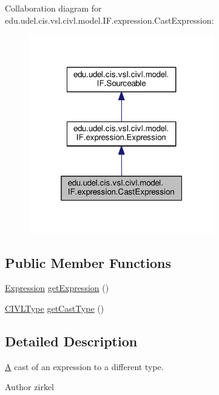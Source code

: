 Collaboration diagram for edu.\+udel.\+cis.\+vsl.\+civl.\+model.\+I\+F.\+expression.\+Cast\+Expression\+:
\nopagebreak
\begin{figure}[H]
\begin{center}
\leavevmode
\includegraphics[width=229pt]{interfaceedu_1_1udel_1_1cis_1_1vsl_1_1civl_1_1model_1_1IF_1_1expression_1_1CastExpression__coll__graph}
\end{center}
\end{figure}
\subsection*{Public Member Functions}
\begin{DoxyCompactItemize}
\item 
\hyperlink{interfaceedu_1_1udel_1_1cis_1_1vsl_1_1civl_1_1model_1_1IF_1_1expression_1_1Expression}{Expression} \hyperlink{interfaceedu_1_1udel_1_1cis_1_1vsl_1_1civl_1_1model_1_1IF_1_1expression_1_1CastExpression_a51f88078737299fb839bbac515078364}{get\+Expression} ()
\item 
\hyperlink{interfaceedu_1_1udel_1_1cis_1_1vsl_1_1civl_1_1model_1_1IF_1_1type_1_1CIVLType}{C\+I\+V\+L\+Type} \hyperlink{interfaceedu_1_1udel_1_1cis_1_1vsl_1_1civl_1_1model_1_1IF_1_1expression_1_1CastExpression_a22dab6e00f9d9e79f0db76d058f02c79}{get\+Cast\+Type} ()
\end{DoxyCompactItemize}


\subsection{Detailed Description}
\hyperlink{structA}{A} cast of an expression to a different type. 

\begin{DoxyAuthor}{Author}
zirkel 
\end{DoxyAuthor}


